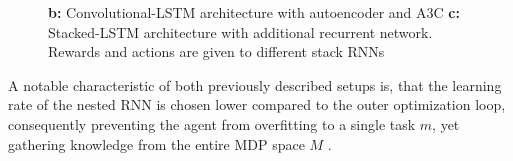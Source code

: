 \documentclass[letterpaper, 10 pt, conference]{ieeeconf}  %
\begin{document}
\begin{figure}[thpb]
        \centering
  \caption{\textbf{b:} Convolutional-LSTM architecture with autoencoder and A3C \newline
        \textbf{c:} Stacked-LSTM architecture with additional recurrent network. Rewards and actions are given to different stack 
        RNNs \cite{wangLearningReinforcementLearn2016}}
        \label{figurelabel}
     \end{figure}
  

A notable characteristic of both previously described setups is, that the learning rate of the nested RNN is chosen lower compared 
to the outer optimization loop, consequently preventing
the agent from overfitting to a single task $m$, yet gathering knowledge from the entire MDP space $M$ 
\cite{botvinickReinforcementLearningFast2019}.\newline
\end{document}
